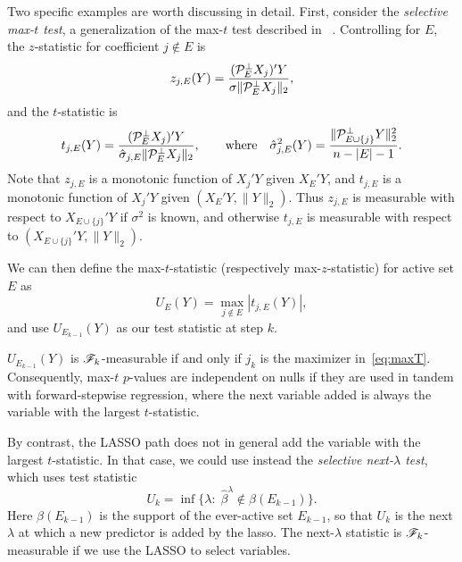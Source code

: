 \documentclass{article}
\begin{document}
Two specific examples are worth discussing in detail. First, consider the {\em selective max-$t$ test}, a generalization of the max-$t$ test described in 
~\citet{buja2014}. Controlling for $E$, the $z$-statistic for coefficient $j\notin E$ is
\begin{equation}
  z_{j,E}(Y) = \frac{(\mathcal{P}_E^\perp X_j)'Y}
  {\sigma\|\mathcal{P}_{E}^\perp X_j\|_2},
\end{equation}
and the $t$-statistic is
\begin{equation}
  t_{j,E}(Y) = \frac{(\mathcal{P}_E^\perp X_j)'Y}
  {\hat \sigma_{j,E} \|\mathcal{P}_{E}^\perp X_j\|_2},
  \qquad \text{where} \quad 
  \hat \sigma_{j,E}^2(Y) = 
  \frac{\|\mathcal{P}_{E \cup \{j\}}^\perp Y\|_2^2}{n-|E|-1}.
\end{equation}
Note that $z_{j,E}$ is a monotonic function of $X_j'Y$ given $X_E'Y$, and $t_{j, E}$ is a monotonic function of $X_j'Y$ given $(X_E'Y, \|Y\|_2)$. Thus $z_{j,E}$ is measurable with respect 
to $X_{E \cup \{j\}}'Y$ if $\sigma^2$ is known, and otherwise $t_{j,E}$ is measurable with respect to $(X_{E \cup \{j\}}'Y, \|Y\|_2)$.

We can then define the max-$t$-statistic (respectively max-$z$-statistic) for active set $E$ as
\begin{equation}\label{eq:maxT}
  U_E(Y) = \max_{j \notin E} \left|t_{j,E}(Y)\right|,
\end{equation}
and use $U_{E_{k-1}}(Y)$ as our test statistic at step $k$.

$U_{E_{k-1}}(Y)$ is $\mathscr{F}_k$-measurable if and only if $j_k$ is the maximizer in~\eqref{eq:maxT}. Consequently, max-$t$ $p$-values are independent on nulls if they are used in tandem with forward-stepwise regression, where the next variable added is always the variable with the largest $t$-statistic.

By contrast, the LASSO path does not in general add the variable with the largest $t$-statistic. In that case, we could use instead the {\em selective next-$\lambda$ test}, which uses test statistic
\begin{equation}
  U_k = \inf\{ \lambda:\; \hat\beta^\lambda \notin \beta(E_{k-1})\}.
\end{equation}
Here $\beta(E_{k-1})$ is the support of the ever-active set $E_{k-1}$, so that $U_k$ is the next $\lambda$ at which a new predictor is added by the lasso.
The next-$\lambda$ statistic is $\mathscr{F}_k$-measurable if we use the LASSO to select variables. 
\end{document}
